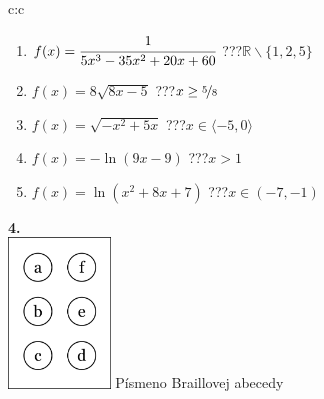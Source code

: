 \documentclass[10pt]{report}
\begin{document}
\begin{tabular}{c:c}
\begin{minipage}[c][104.5mm][t]{0.5\linewidth}
\begin{center}
\begin{minipage}{0.79\linewidth}
\begin{center}
\begin{varwidth}{\linewidth}
\begin{enumerate}
\item $f(x)=\cfrac{1}{5x^3-35x^2+20x+60}$\quad \dotfill\; ???\;\dotfill \quad $\mathbb{R}\smallsetminus\{1,2,5\}$
\item $f(x)=8\sqrt{8x-5}$\quad \dotfill\; ???\;\dotfill \quad $x\geq\nicefrac{5}{8}$
\item $f(x)=\sqrt{-x^2+5x}$\quad \dotfill\; ???\;\dotfill \quad $x\in\langle-5 , 0\rangle$
\item $f(x)=-\ln{(9x-9)}$\quad \dotfill\; ???\;\dotfill \quad $x>1$
\item $f(x)=\ln{(x^2+8x+7)}$\quad \dotfill\; ???\;\dotfill \quad $x\in(-7 , -1)$
\end{enumerate}
\end{varwidth}
\end{center}
\end{minipage}
\begin{minipage}{0.20\linewidth}
\begin{center}
{\Huge\bfseries 4.} \\[2mm]
\includegraphics[height=40mm]{../images/braille.png}
{\small Písmeno Braillovej abecedy}
\end{center}
\end{minipage}
\end{center}
\end{minipage}
%
\end{tabular}
\newpage
\thispagestyle{empty}
\end{document}
